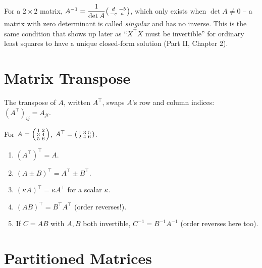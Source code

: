 \documentclass[11pt]{article}
\begin{document}
For a $2\times 2$ matrix, $A^{-1} = \dfrac{1}{\det A}
\begin{psmallmatrix} d & -b \\ -c & a \end{psmallmatrix}$, which only
exists when $\det A \ne 0$ -- a matrix with zero determinant is called
\emph{singular} and has no inverse. This is the same condition that shows
up later as ``$X^\top X$ must be invertible'' for ordinary least squares
to have a unique closed-form solution (Part II, Chapter 2).

\section{Matrix Transpose}

\begin{definition}[Transpose]
The transpose of $A$, written $A^\top$, swaps $A$'s row and column
indices: $(A^\top)_{ij} = A_{ji}$.
\end{definition}

\begin{example}
For $A = \begin{psmallmatrix}1&2\\3&4\\5&6\end{psmallmatrix}$,
$A^\top = \begin{psmallmatrix}1&3&5\\2&4&6\end{psmallmatrix}$.
\end{example}

\begin{theorem}
\begin{enumerate}
  \item $(A^\top)^\top = A$.
  \item $(A \pm B)^\top = A^\top \pm B^\top$.
  \item $(\kappa A)^\top = \kappa A^\top$ for a scalar $\kappa$.
  \item $(AB)^\top = B^\top A^\top$ (order reverses!).
  \item If $C = AB$ with $A, B$ both invertible, $C^{-1} = B^{-1}A^{-1}$
        (order reverses here too).
\end{enumerate}
\end{theorem}

\section{Partitioned Matrices}
\end{document}
